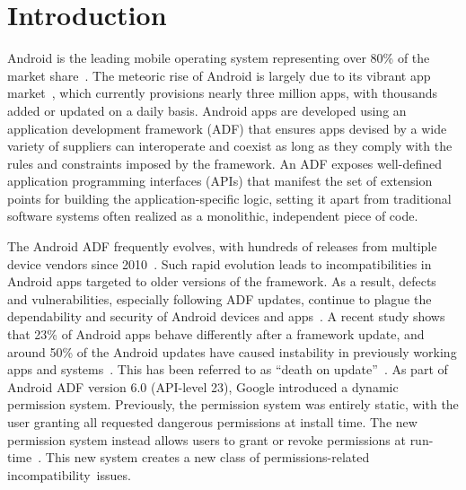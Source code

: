 \section{Introduction}\label{sec-intro}
\sloppy
Android is the leading mobile operating system representing over 80\% of the
market share~\cite{androidmarketstatistics}. The meteoric rise of Android is
largely due to its vibrant app market~\cite{googleplayapps}, which currently
provisions nearly three million apps, with thousands added or updated on a
daily basis.  Android apps are developed using an application development
framework (ADF) that ensures apps devised by a wide variety of suppliers can
interoperate and coexist as long as they comply with the rules and
constraints imposed by the framework.  An ADF exposes well-defined application
programming interfaces (APIs) that manifest the set of extension points for
building the application-specific logic, setting it apart from traditional
software systems often realized as a monolithic, independent piece of code.

The Android ADF frequently evolves, with hundreds of releases from multiple
device vendors since 2010~\cite{AndroidReleases}.
Such rapid evolution leads to
incompatibilities in Android apps targeted to older
versions of the framework.  As a result, defects and vulnerabilities, especially
following ADF updates, continue to plague the dependability and security of
Android devices and apps~\cite{linares2014api,Update4}. A recent
study shows that 23\% of Android apps behave differently after a framework
update, and around 50\% of the Android updates have caused instability in previously working
apps and systems~\cite{Helppi2014}. This has been referred to as ``death on
update''~\cite{death1,death2,death3,death4,iOS,youtube}.
 As part of Android ADF version 6.0 (API-level 23), Google introduced a dynamic permission system.  
Previously, the permission system was entirely static, with the user
granting all requested dangerous permissions at install
time.  The new permission system instead allows users to
grant or revoke permissions at
run-time~\cite{permissiongroups}.  This new system creates a
new class of permissions-related incompatibility~issues.

